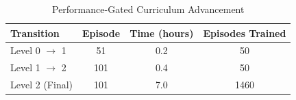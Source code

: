 \begin{table}[htbp]
\centering
\caption{Performance-Gated Curriculum Advancement}
\label{tab:curriculum_advancement}
\begin{tabular}{lccc}
\toprule
\textbf{Transition} & \textbf{Episode} & \textbf{Time (hours)} & \textbf{Episodes Trained} \\
\midrule
Level 0 $\rightarrow$ 1 & 51 & 0.2 & 50 \\
Level 1 $\rightarrow$ 2 & 101 & 0.4 & 50 \\
Level 2 (Final) & 101 & 7.0 & 1460 \\
\bottomrule
\end{tabular}
\end{table}
